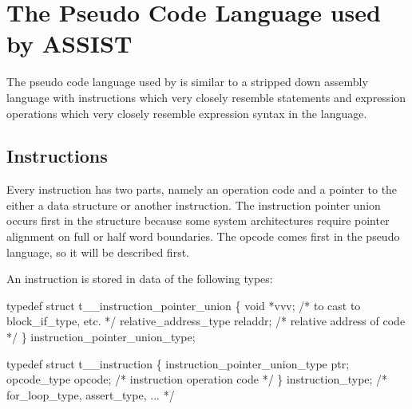 \section{The Pseudo Code Language used by ASSIST}
\label{chap:pseudo}

The pseudo code language used by  is similar to a stripped down
assembly language with instructions which very closely resemble statements
and expression operations which very closely
resemble expression syntax in the  language.

\subsection{Instructions}
\label{sec:instructions}

Every instruction has two parts, namely an operation code and a pointer to
the either a data structure or another instruction.  The instruction pointer
union occurs first in the structure because some
system architectures require pointer alignment on full or half word boundaries.
The opcode comes first in the pseudo language, so it will be described first.

An instruction is stored in data of the following types:
\begin{codeexample}
typedef struct t__instruction_pointer_union
   \{
       void *vvv;                      /* to cast to block_if_type, etc. */
       relative_address_type reladdr;  /* relative address of code */
   \} instruction_pointer_union_type;
\end{codeexample}

\begin{codeexample}
typedef struct t__instruction
   \{
       instruction_pointer_union_type ptr;
       opcode_type opcode;      /* instruction operation code */
   \} instruction_type;          /*    for_loop_type, assert_type, ... */
\end{codeexample}


